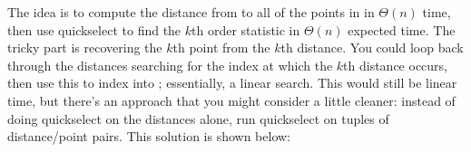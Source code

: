 \begin{progprob}
    \begin{soln}
        The idea is to compute the distance from  to all of the points
        in  in $\Theta(n)$ time, then use quickselect to find the
        $k$th order statistic in $\Theta(n)$ expected time. The tricky part is
        recovering the $k$th point from the $k$th distance. You could loop back
        through the distances searching for the index at which the $k$th
        distance occurs, then use this to index into ; essentially,
        a linear search. This would still be linear time, but there's an
        approach that you might consider a little cleaner: instead of doing
        quickselect on the distances alone, run quickselect on tuples of
        distance/point pairs. This solution is shown below:

        \inputminted{python}{\thisdir/include-solution/knn_distance.py}
    \end{soln}
\end{progprob}
